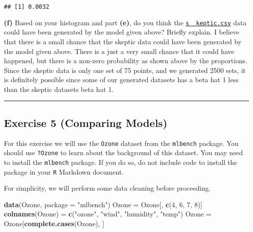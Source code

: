 \documentclass[]{article}
\newenvironment{Shaded}{\begin{snugshade}}{\end{snugshade}}
\newcommand{\KeywordTok}[1]{\textcolor[rgb]{0.13,0.29,0.53}{\textbf{#1}}}
\newcommand{\DataTypeTok}[1]{\textcolor[rgb]{0.13,0.29,0.53}{#1}}
\newcommand{\DecValTok}[1]{\textcolor[rgb]{0.00,0.00,0.81}{#1}}
\newcommand{\StringTok}[1]{\textcolor[rgb]{0.31,0.60,0.02}{#1}}
\newcommand{\NormalTok}[1]{#1}
\begin{document}
\begin{verbatim}
## [1] 0.0032
\end{verbatim}

\textbf{(f)} Based on your histogram and part \textbf{(e)}, do you think
the \href{skeptic.csv}{\texttt{s\ \ keptic.csv}} data could have been
generated by the model given above? Briefly explain. I believe that
there is a small chance that the skeptic data could have been generated
by the model given above. There is a just a very small chance that it
could have happened, but there is a non-zero probability as shown above
by the proportions. Since the skeptic data is only one set of 75 points,
and we generated 2500 sets, it is definitely possible since some of our
generated datasets has a beta hat 1 less than the skeptic datasets beta
hat 1.

\begin{center}\rule{0.5\linewidth}{\linethickness}\end{center}

\subsection{Exercise 5 (Comparing
Models)}\label{exercise-5-comparing-models}

For this exercise we will use the \texttt{Ozone} dataset from the
\texttt{mlbench} package. You should use \texttt{?Ozone} to learn about
the background of this dataset. You may need to install the
\texttt{mlbench} package. If you do so, do not include code to install
the package in your \texttt{R} Markdown document.

For simplicity, we will perform some data cleaning before proceeding.

\begin{Shaded}
\begin{Highlighting}[]
\KeywordTok{data}\NormalTok{(Ozone, }\DataTypeTok{package =} \StringTok{"mlbench"}\NormalTok{)}
\NormalTok{Ozone =}\StringTok{ }\NormalTok{Ozone[, }\KeywordTok{c}\NormalTok{(}\DecValTok{4}\NormalTok{, }\DecValTok{6}\NormalTok{, }\DecValTok{7}\NormalTok{, }\DecValTok{8}\NormalTok{)]}
\KeywordTok{colnames}\NormalTok{(Ozone) =}\StringTok{ }\KeywordTok{c}\NormalTok{(}\StringTok{"ozone"}\NormalTok{, }\StringTok{"wind"}\NormalTok{, }\StringTok{"humidity"}\NormalTok{, }\StringTok{"temp"}\NormalTok{)}
\NormalTok{Ozone =}\StringTok{ }\NormalTok{Ozone[}\KeywordTok{complete.cases}\NormalTok{(Ozone), ]}
\end{Highlighting}
\end{Shaded}
\end{document}
